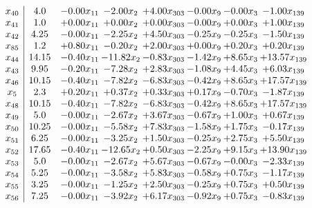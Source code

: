 \documentclass[8pt]{article}
\begin{document}
\[\begin{array}{c| c c@{\hskip 2pt} c@{\hskip 2pt} c@{\hskip 2pt} c@{\hskip 2pt} c@{\hskip 2pt} c@{\hskip 2pt} }
 x_{40}   &  4.0 & -0.00 x_{11} & -2.00 x_{2} & +  4.00 x_{303} & -0.00 x_{9} & -0.00 x_{3} & -1.00 x_{139}\\
 x_{41}   &  1.0 & +  0.00 x_{11} & +  0.00 x_{2} & +  0.00 x_{303} & -0.00 x_{9} & +  0.00 x_{3} & +  1.00 x_{139}\\
 x_{42}   &  4.25 & -0.00 x_{11} & -2.25 x_{2} & +  4.50 x_{303} & -0.25 x_{9} & -0.25 x_{3} & -1.50 x_{139}\\
 x_{85}   &  1.2 & +  0.80 x_{11} & -0.20 x_{2} & +  2.00 x_{303} & +  0.00 x_{9} & +  0.20 x_{3} & +  0.20 x_{139}\\
 x_{44}   &  14.15 & -0.40 x_{11} & -11.82 x_{2} & -0.83 x_{303} & -1.42 x_{9} & +  8.65 x_{3} & + 13.57 x_{139}\\
 x_{43}   &  9.95 & -0.20 x_{11} & -7.28 x_{2} & +  2.83 x_{303} & -1.08 x_{9} & +  4.45 x_{3} & +  6.03 x_{139}\\
 x_{46}   &  10.15 & -0.40 x_{11} & -7.82 x_{2} & -6.83 x_{303} & -0.42 x_{9} & +  8.65 x_{3} & + 17.57 x_{139}\\
 x_{5}   &  2.3 & +  0.20 x_{11} & +  0.37 x_{2} & +  0.33 x_{303} & +  0.17 x_{9} & -0.70 x_{3} & -1.87 x_{139}\\
 x_{48}   &  10.15 & -0.40 x_{11} & -7.82 x_{2} & -6.83 x_{303} & -0.42 x_{9} & +  8.65 x_{3} & + 17.57 x_{139}\\
 x_{49}   &  5.0 & -0.00 x_{11} & -2.67 x_{2} & +  3.67 x_{303} & -0.67 x_{9} & +  1.00 x_{3} & +  0.67 x_{139}\\
 x_{50}   &  10.25 & -0.00 x_{11} & -5.58 x_{2} & +  7.83 x_{303} & -1.58 x_{9} & +  1.75 x_{3} & -0.17 x_{139}\\
 x_{51}   &  6.25 & -0.00 x_{11} & -3.25 x_{2} & +  1.50 x_{303} & -0.25 x_{9} & +  2.75 x_{3} & +  5.50 x_{139}\\
 x_{52}   &  17.65 & -0.40 x_{11} & -12.65 x_{2} & +  0.50 x_{303} & -2.25 x_{9} & +  9.15 x_{3} & + 13.90 x_{139}\\
 x_{53}   &  5.0 & -0.00 x_{11} & -2.67 x_{2} & +  5.67 x_{303} & -0.67 x_{9} & -0.00 x_{3} & -2.33 x_{139}\\
 x_{54}   &  5.25 & -0.00 x_{11} & -3.58 x_{2} & +  5.83 x_{303} & -0.58 x_{9} & +  0.75 x_{3} & -1.17 x_{139}\\
 x_{55}   &  3.25 & -0.00 x_{11} & -1.25 x_{2} & +  2.50 x_{303} & -0.25 x_{9} & +  0.75 x_{3} & +  0.50 x_{139}\\
 x_{56}   &  7.25 & -0.00 x_{11} & -3.92 x_{2} & +  6.17 x_{303} & -0.92 x_{9} & +  0.75 x_{3} & -0.83 x_{139}\\

\end{array}\]
\end{document}
